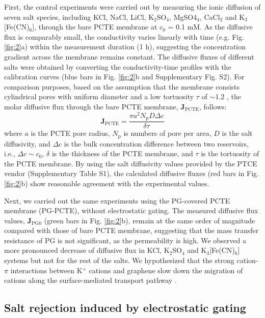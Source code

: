 \documentclass[journal=langd5,email=true, hyperref=true, keywords=false]{achemso}
\newcommand{\Fig}{Fig.}
\begin{document}
First, the control experiments were carried out by measuring the ionic
diffusion of seven salt species, including KCl, NaCl, LiCl,
K$_{2}$SO$_{4}$, MgSO4$_{4}$, CaCl$_{2}$ and K$_{3}$[Fe(CN)$_{6}$],
through the bare PCTE membrane at $c_{0}$ = 0.1 mM. As the diffusive
flux is comparably small, the conductivity varies linearly with time
(e.g. \Fig{} \ref{fig:2}a) within the measurement duration (1 h),
suggesting the concentration gradient across the membrane remains
constant. The diffusive fluxes of different salts were
obtained by converting the conductivity-time profiles with the
calibration curves (blue bars in \Fig{} \ref{fig:2}b and Supplementary
\Fig{} S2). For comparison purposes, based on the assumption that the
membrane consists cylindrical pores with uniform diameter and a low
tortuosity $\tau$ of $\sim{}$1.2 \cite{O_Hern_2012}, the molar
diffusive flux through the bare PCTE membrane,
$\boldsymbol{J}_{\mathrm{PCTE}}$, follows:
  \begin{equation}
    \label{eq:j-pcte}
    \boldsymbol{J}_{\mathrm{PCTE}} = \frac{\pi a^{2} N_{\mathrm{p}} D \Delta c}{\delta \tau}
  \end{equation}
where $a$ is the PCTE pore radius, $N_{\mathrm{p}}$ is numbers of pore
per area, $D$ is the salt diffusivity, and $\Delta c$ is the bulk
concentration difference between two reservoirs, i.e.,
$\Delta c \sim c_{0}$, $\delta$ is the thickness of the PCTE membrane,
and $\tau$ is the tortuosity of the PCTE membrane. By using the salt diffusivity values
provided by the PTCE vendor (Supplementary Table S1), the
calculated diffusive fluxes (red bars in \Fig{} \ref{fig:2}b) show
reasonable agreement with the experimental values.

Next, we carried out the same experiments using the PG-covered PCTE
membrane (PG-PCTE), without electrostatic gating. The measured
diffusive flux values, $\boldsymbol{J}_{\mathrm{PG0}}$ (green bars in
\Fig{} \ref{fig:2}b), remain at the same order of magnitude compared
with those of bare PCTE membrane, suggesting that the mass transfer
resistance of PG is not significant, as the permeability is high. We
observed a more pronounced decrease of diffusive flux in KCl,
K$_{2}$SO$_{4}$ and K$_{3}$[Fe(CN)$_{6}$] systems but not for the rest
of the salts. We hypothesized that the strong cation-$\pi$ interactions
between K$^{+}$ cations and graphene slow down the migration of cations
along the surface-mediated transport pathway \cite{Sun_2014}.

\subsection{Salt rejection induced by electrostatic gating}
\label{sec:res-2}
\end{document}
